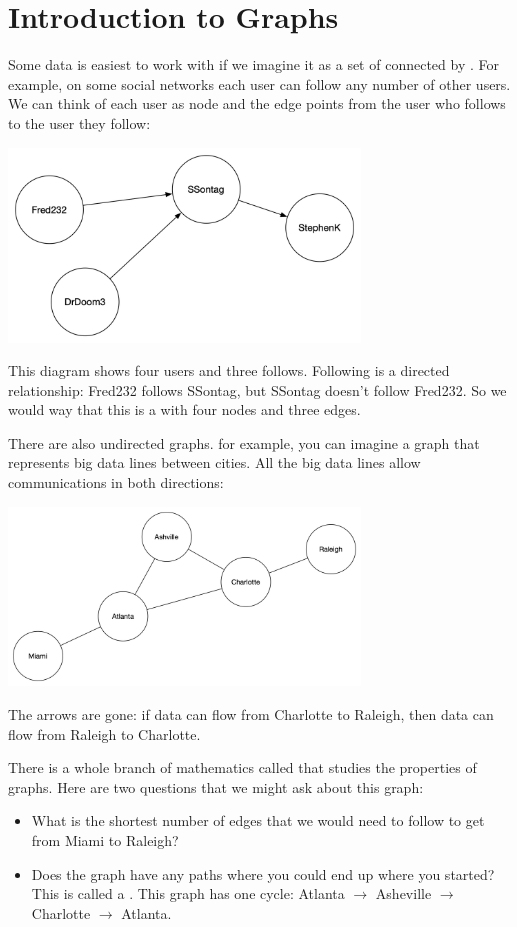 \chapter{Introduction to Graphs}

Some data is easiest to work with if we imagine it as a set of  connected by .  For example,  on some social networks each user can follow any number of other users.  We can think of each user as node and the edge points from the user who follows to the user they follow:

\includegraphics[width=0.7\textwidth]{simpledirected.png}

This diagram shows four users and three follows.   Following  is a directed relationship: Fred232 follows SSontag, but SSontag doesn't follow Fred232.   So we would way that this is a  with four nodes and three edges.

There are also undirected graphs.  for example,  you can imagine a graph that represents big data lines between cities.  All the big data lines allow communications in both directions:

\includegraphics[width=0.7\textwidth]{simpleundirected.png}

The arrows are gone: if data can flow from Charlotte to Raleigh, then data can flow from Raleigh to Charlotte.

There is a whole branch of mathematics called  that studies the properties of graphs.  Here are two questions that we might ask about this graph:
\begin{itemize}
\item What is the shortest number of edges that we would need to follow to get from Miami to Raleigh?
\item Does the graph have any paths where you could end up where you started? This is called a .  This graph has one cycle: Atlanta $\rightarrow$ Asheville $\rightarrow$ Charlotte $\rightarrow$ Atlanta.
\end{itemize}

